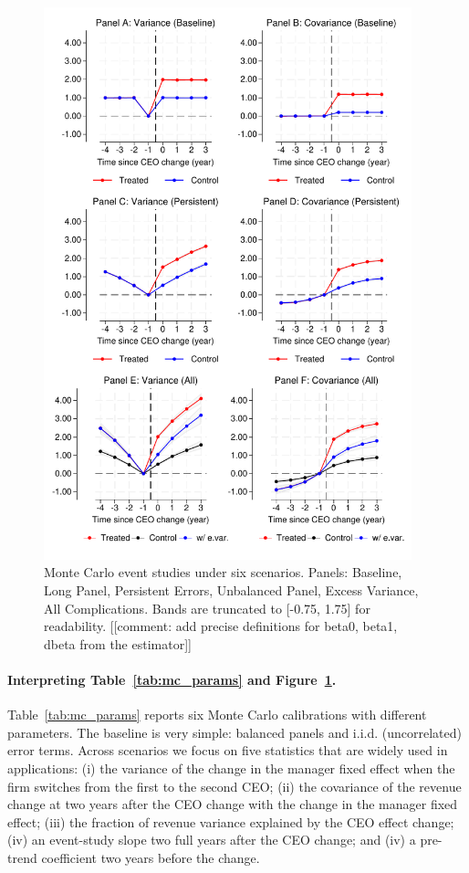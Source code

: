 \documentclass[11pt,a4paper]{article}
\begin{document}
\begin{figure}[htbp]
\centering
\includegraphics[width=0.95\textwidth]{figure/figuremc.pdf}
\caption{Monte Carlo event studies under six scenarios. Panels: Baseline, Long Panel, Persistent Errors, Unbalanced Panel, Excess Variance, All Complications. Bands are truncated to [-0.75, 1.75] for readability. [[comment: add precise definitions for beta0, beta1, dbeta from the estimator]]}
\label{fig:mc}
\end{figure}

\paragraph{Interpreting Table~\ref{tab:mc_params} and Figure~\ref{fig:mc}.}
Table~\ref{tab:mc_params} reports six Monte Carlo calibrations with different parameters. The baseline is very simple: balanced panels and i.i.d. (uncorrelated) error terms. Across scenarios we focus on five statistics that are widely used in applications: (i) the variance of the change in the manager fixed effect when the firm switches from the first to the second CEO; (ii) the covariance of the revenue change at two years after the CEO change with the change in the manager fixed effect; (iii) the fraction of revenue variance explained by the CEO effect change; (iv) an event-study slope two full years after the CEO change; and (iv) a pre-trend coefficient two years before the change.
\end{document}
